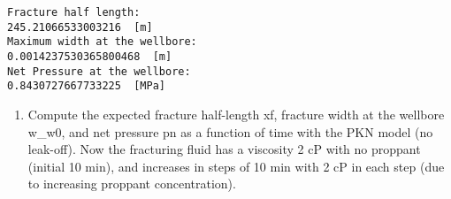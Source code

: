 \documentclass[11pt]{article}
\providecommand{\tightlist}{%
      \setlength{\itemsep}{0pt}\setlength{\parskip}{0pt}}
\begin{document}
    \begin{Verbatim}[commandchars=\\\{\}]
Fracture half length:
245.21066533003216  [m]
Maximum width at the wellbore:
0.0014237530365800468  [m]
Net Pressure at the wellbore:
0.8430727667733225  [MPa]

    \end{Verbatim}

    \begin{enumerate}
\def\labelenumi{\alph{enumi}.}
\setcounter{enumi}{1}
\tightlist
\item
  Compute the expected fracture half-length xf, fracture width at the
  wellbore w\_w0, and net pressure pn as a function of time with the PKN
  model (no leak-off). Now the fracturing fluid has a viscosity 2 cP
  with no proppant (initial 10 min), and increases in steps of 10 min
  with 2 cP in each step (due to increasing proppant concentration).
\end{enumerate}
\end{document}
